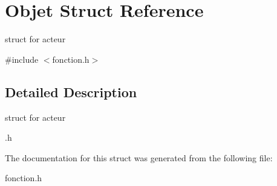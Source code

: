 \hypertarget{structObjet}{}\section{Objet Struct Reference}
\label{structObjet}


struct for acteur  




{\ttfamily \#include $<$fonction.\+h$>$}



\subsection{Detailed Description}
struct for acteur 

.h 

The documentation for this struct was generated from the following file\+:\begin{DoxyCompactItemize}
\item 
fonction.\+h\end{DoxyCompactItemize}
